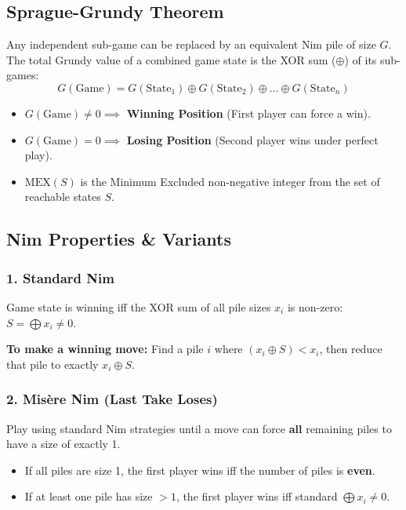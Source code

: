 \subsection{Sprague-Grundy Theorem}
\par Any independent sub-game can be replaced by an equivalent Nim pile of size $G$. The total Grundy value of a combined game state is the XOR sum ($\oplus$) of its sub-games:
$$G(\text{Game}) = G(\text{State}_1) \oplus G(\text{State}_2) \oplus \dots \oplus G(\text{State}_n)$$
\begin{itemize}
    \item $G(\text{Game}) \neq 0 \implies$ \textbf{Winning Position} (First player can force a win).
    \item $G(\text{Game}) = 0 \implies$ \textbf{Losing Position} (Second player wins under perfect play).
    \item $\text{MEX}(S)$ is the Minimum Excluded non-negative integer from the set of reachable states $S$.
\end{itemize}

\subsection{Nim Properties \& Variants}

\subsubsection{1. Standard Nim}
\par Game state is winning iff the XOR sum of all pile sizes $x_i$ is non-zero: $S = \bigoplus x_i \neq 0$.
\par \textbf{To make a winning move:} Find a pile $i$ where $(x_i \oplus S) < x_i$, then reduce that pile to exactly $x_i \oplus S$.

\subsubsection{2. Mis\`ere Nim (Last Take Loses)}
\par Play using standard Nim strategies until a move can force \textbf{all} remaining piles to have a size of exactly 1.
\begin{itemize}
    \item If all piles are size 1, the first player wins iff the number of piles is \textbf{even}.
    \item If at least one pile has size $> 1$, the first player wins iff standard $\bigoplus x_i \neq 0$.
\end{itemize}

